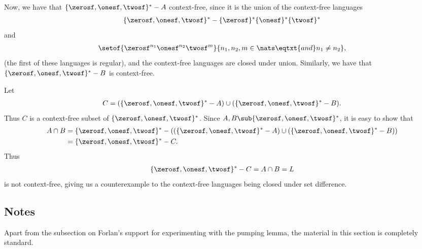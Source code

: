 Now, we have that
$\{\zerosf,\onesf,\twosf\}^*-A$ context-free, since it is the
union of the context-free languages
\begin{gather*}
\{\zerosf,\onesf,\twosf\}^*-\{\zerosf\}^*\{\onesf\}^*\{\twosf\}^*
\end{gather*}
and
\begin{gather*}
\setof{\zerosf^{n_1}\onesf^{n_2}\twosf^m}{n_1,n_2,m\in\nats
\eqtxt{and}n_1\neq n_2} ,
\end{gather*}
(the first of these languages is regular), and the context-free languages
are closed under union.
Similarly, we have that $\{\zerosf,\onesf,\twosf\}^*-B$ is
context-free.

Let
\begin{gather*}
C=(\{\zerosf,\onesf,\twosf\}^*-A) \cup (\{\zerosf,\onesf,\twosf\}^*-B) .
\end{gather*}
Thus $C$ is a context-free subset of $\{\zerosf,\onesf,\twosf\}^*$.
Since $A,B\sub\{\zerosf,\onesf,\twosf\}^*$, it is easy to show that
\begin{align*}
A\cap B &= \{\zerosf,\onesf,\twosf\}^*-
((\{\zerosf,\onesf,\twosf\}^*-A)\cup(\{\zerosf,\onesf,\twosf\}^*-B)) \\
&= \{\zerosf,\onesf,\twosf\}^*-C .
\end{align*}
Thus
\begin{gather*}
\{\zerosf,\onesf,\twosf\}^*-C = A\cap B = L
\end{gather*}
is not context-free, giving us a counterexample to the
context-free languages being closed under set difference.

\subsection{Notes}

Apart from the subsection on Forlan's support for experimenting with
the pumping lemma, the material in this section is completely
standard.

